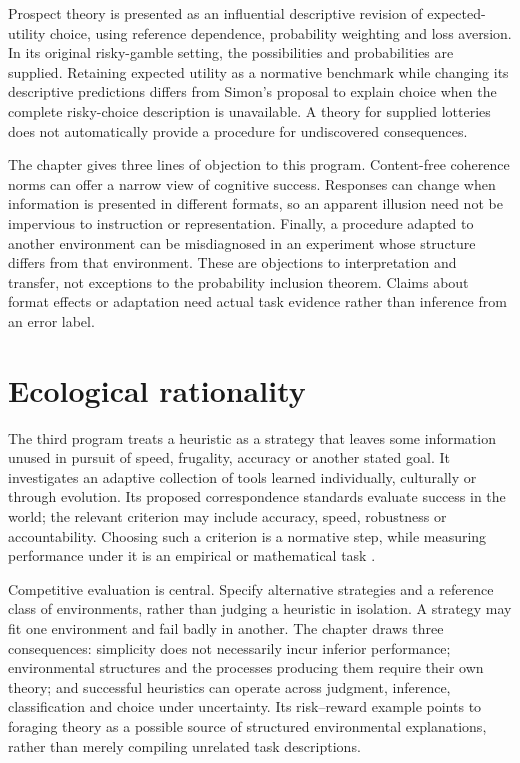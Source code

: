 Prospect theory is presented as an influential descriptive revision of
expected-utility choice, using reference dependence, probability weighting
and loss aversion. In its original risky-gamble setting, the possibilities
and probabilities are supplied. Retaining expected utility as a normative
benchmark while changing its descriptive predictions differs from
Simon's proposal to explain choice when the complete risky-choice
description is unavailable. A theory for supplied lotteries does not
automatically provide a procedure for undiscovered consequences.

The chapter gives three lines of objection to this program. Content-free
coherence norms can offer a narrow view of cognitive success. Responses
can change when information is presented in different formats, so an
apparent illusion need not be impervious to instruction or representation.
Finally, a procedure adapted to another environment can be misdiagnosed
in an experiment whose structure differs from that environment. These
are objections to interpretation and transfer, not exceptions to the
probability inclusion theorem. Claims about format effects or adaptation
need actual task evidence rather than inference from an error label.

\section{Ecological rationality}
\label{sec:p17-br-ecological}

The third program treats a heuristic as a strategy that leaves some
information unused in pursuit of speed, frugality, accuracy or another
stated goal. It investigates an adaptive collection of tools learned
individually, culturally or through evolution. Its proposed correspondence
standards evaluate success in the world; the relevant criterion may include
accuracy, speed, robustness or accountability. Choosing such a criterion
is a normative step, while measuring performance under it is an empirical
or mathematical task \cite[pp.~510--512]{HertwigKozyreva2021Bounded}.

Competitive evaluation is central. Specify alternative strategies and a
reference class of environments, rather than judging a heuristic in isolation.
A strategy may fit one environment and fail badly in another. The chapter
draws three consequences: simplicity does not necessarily incur inferior
performance; environmental structures and the processes producing them
require their own theory; and successful heuristics can operate across
judgment, inference, classification and choice under uncertainty. Its
risk--reward example points to foraging theory as a possible source of
structured environmental explanations, rather than merely compiling
unrelated task descriptions.


